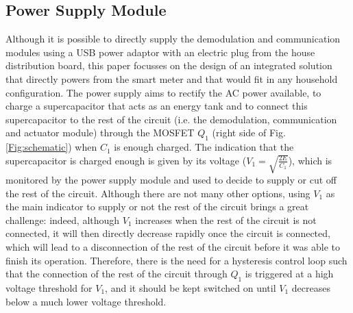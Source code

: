 \documentclass[conference]{IEEEtran}
\begin{document}
\subsection{Power Supply Module}
Although it is possible to directly supply the demodulation and communication modules using a USB power adaptor with an electric plug from the house distribution board, this paper focusses on the design of an integrated solution that directly powers from the smart meter and that would fit in any household configuration. 
The power supply aims to rectify the AC power available, to charge a supercapacitor that acts as an energy tank and to connect this supercapacitor to the rest of the circuit (i.e. the demodulation, communication and actuator module) through the MOSFET $Q_1$ (right side of Fig. \ref{Fig:schematic}) when $C_1$ is enough charged. The indication that the supercapacitor is charged enough is given by its voltage ($V_1=\sqrt{\frac{2E}{C_1}}$), which is monitored by the power supply module and used to decide to  supply or cut off  the rest of the circuit.
Although there are not many other options, using $V_1$ as the main indicator to supply or not the rest of the circuit brings a great challenge: indeed, although $V_1$ increases when the rest of the circuit is not connected, it will then directly decrease rapidly once the circuit is connected, which will lead to a disconnection of the rest of the circuit before it was able to finish its operation. Therefore, there is the need for a hysteresis control loop such that the connection of the rest of the circuit through  $Q_1$ is triggered at a high voltage threshold for $V_1$, and it should be kept switched on until $V_1$ decreases below a much lower voltage threshold. 
%
%
\end{document}
